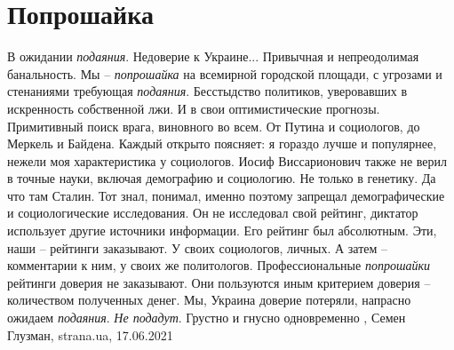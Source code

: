  
 
 
 
 
\chapter{Попрошайка}
\label{sec:slova.poproshajka}

В ожидании \emph{подаяния}.  Недоверие к Украине... Привычная и непреодолимая
банальность. Мы – \emph{попрошайка} на всемирной городской площади, с угрозами
и стенаниями требующая \emph{подаяния}.  Бесстыдство политиков, уверовавших в
искренность собственной лжи. И в свои оптимистические прогнозы.  Примитивный
поиск врага, виновного во всем. От Путина и социологов, до Меркель и Байдена.
Каждый открыто поясняет: я гораздо лучше и популярнее, нежели моя
характеристика у социологов. Иосиф Виссарионович также не верил в точные науки,
включая демографию и социологию. Не только в генетику.  Да что там Сталин. Тот
знал, понимал, именно поэтому запрещал демографические и социологические
исследования. Он не исследовал свой рейтинг, диктатор использует другие
источники информации. Его рейтинг был абсолютным. Эти, наши – рейтинги
заказывают. У своих социологов, личных. А затем – комментарии к ним, у своих же
политологов.  Профессиональные \emph{попрошайки} рейтинги доверия не
заказывают. Они пользуются иным критерием доверия – количеством полученных
денег. Мы, Украина доверие потеряли, напрасно ожидаем \emph{подаяния}. \emph{Не
подадут}.  Грустно и гнусно одновременно
, 
Семен Глузман, strana.ua, 17.06.2021

